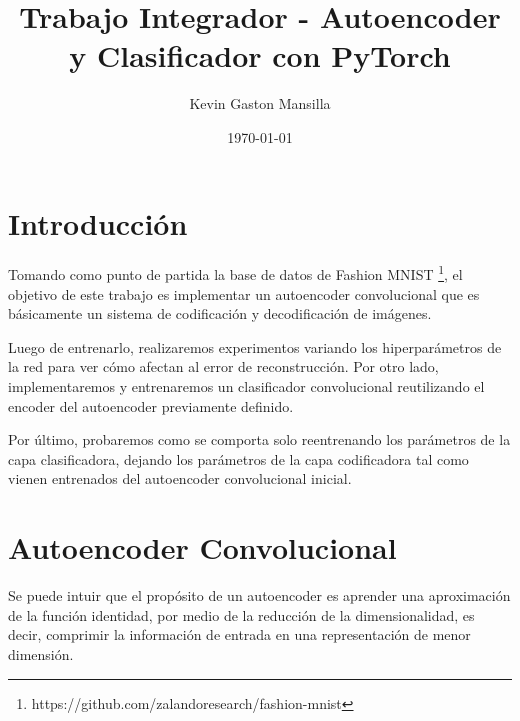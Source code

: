 \documentclass[aps,prl,reprint,groupedaddress]{revtex4-2}
\begin{document}
\title{
Trabajo Integrador - Autoencoder y Clasificador con PyTorch
}

\author{Kevin Gaston Mansilla}

\affiliation{}

\date{\today}

\begin{abstract}
\end{abstract}


\maketitle

\section{Introducción}

Tomando como punto de partida la base de datos de Fashion MNIST
\footnote{https://github.com/zalandoresearch/fashion-mnist}, el objetivo de 
este trabajo es implementar un autoencoder convolucional que es básicamente 
un sistema de codificación y decodificación de imágenes.

Luego de entrenarlo, realizaremos experimentos variando los 
hiperparámetros de la red para ver cómo afectan al error de reconstrucción. 
Por otro lado, implementaremos y entrenaremos un clasificador convolucional 
reutilizando el encoder del autoencoder previamente definido. 

Por último, probaremos como se comporta solo reentrenando los parámetros de la 
capa clasificadora, dejando los parámetros de la capa codificadora tal 
como vienen entrenados del autoencoder convolucional inicial.

\section{Autoencoder Convolucional}
Se puede intuir que el propósito de un autoencoder es aprender una aproximación 
de la función identidad, por medio de la reducción de la dimensionalidad,
es decir, comprimir la información de entrada en una representación de menor
dimensión.
\end{document}
